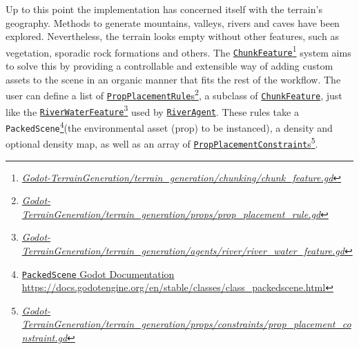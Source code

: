 Up to this point the implementation has concerned itself with the terrain's geography.
Methods to generate mountains, valleys, rivers and caves have been explored.
Nevertheless, the terrain looks empty without other features, such as vegetation, sporadic rock formations and others.
The \href{https://github.com/fsande/TFG---Eric-Rios/blob/main/Godot-TerrainGeneration/terrain_generation/chunking/chunk_feature.gd}{\texttt{ChunkFeature}}\footnote{\href{https://github.com/fsande/TFG---Eric-Rios/blob/main/Godot-TerrainGeneration/terrain_generation/chunking/chunk_feature.gd}{\textit{Godot-TerrainGeneration/terrain\_generation/chunking/chunk\_feature.gd}}} system aims to solve this by providing a controllable and extensible way of adding custom assets to the scene in an organic manner that fits the rest of the workflow.
The user can define a list of \href{https://github.com/fsande/TFG---Eric-Rios/blob/main/Godot-TerrainGeneration/terrain_generation/props/prop_placement_rule.gd}{\texttt{PropPlacementRule}s}\footnote{\href{https://github.com/fsande/TFG---Eric-Rios/blob/main/Godot-TerrainGeneration/terrain_generation/props/prop_placement_rule.gd}{\textit{Godot-TerrainGeneration/terrain\_generation/props/prop\_placement\_rule.gd}}}, a subclass of \href{https://github.com/fsande/TFG---Eric-Rios/blob/main/Godot-TerrainGeneration/terrain_generation/chunking/chunk_feature.gd}{\texttt{ChunkFeature}}, just like the \href{https://github.com/fsande/TFG---Eric-Rios/blob/main/Godot-TerrainGeneration/terrain_generation/agents/river/river_water_feature.gd}{\texttt{RiverWaterFeature}}\footnote{\href{https://github.com/fsande/TFG---Eric-Rios/blob/main/Godot-TerrainGeneration/terrain_generation/agents/river/river_water_feature.gd}{\textit{Godot-TerrainGeneration/terrain\_generation/agents/river/river\_water\_feature.gd}}} used by \href{https://github.com/fsande/TFG---Eric-Rios/tree/main/Godot-TerrainGeneration/terrain_generation/agents/river}{\texttt{RiverAgent}}.
These rules take a \texttt{PackedScene}\footnote{\href{https://docs.godotengine.org/en/stable/classes/class_packedscene.html}{\texttt{PackedScene} Godot Documentation\\ \hspace*{1.9em}\url{https://docs.godotengine.org/en/stable/classes/class_packedscene.html}}}(the environmental asset (prop) to be instanced), a density and optional density map, as well as an array of \href{https://github.com/fsande/TFG---Eric-Rios/blob/main/Godot-TerrainGeneration/terrain_generation/props/constraints/prop_placement_constraint.gd}{\texttt{PropPlacementConstraint}s}\footnote{\href{https://github.com/fsande/TFG---Eric-Rios/blob/main/Godot-TerrainGeneration/terrain_generation/props/constraints/prop_placement_constraint.gd}{\textit{Godot-TerrainGeneration/terrain\_generation/props/constraints/prop\_placement\_constraint.gd}}}.
